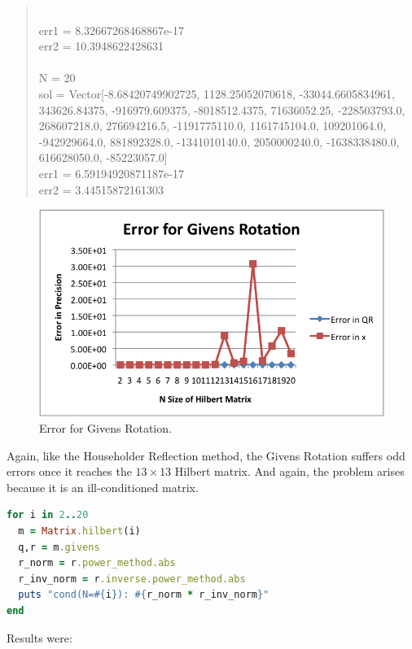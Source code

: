 \documentclass[letterpaper,12pt]{article}
\begin{document}
\begin{quote}
\\err1 = 8.32667268468867e-17
\\err2 = 10.3948622428631
\\
\\N = 20
\\sol = Vector[-8.68420749902725, 1128.25052070618, -33044.6605834961, 343626.84375, -916979.609375, -8018512.4375, 71636052.25, -228503793.0, 268607218.0, 276694216.5, -1191775110.0, 1161745104.0, 109201064.0, -942929664.0, 881892328.0, -1341010140.0, 2050000240.0, -1638338480.0, 616628050.0, -85223057.0]
\\err1 = 6.59194920871187e-17
\\err2 = 3.44515872161303
\end{quote}

\begin{figure}[h] 
  \centering
  \includegraphics{givens.png}
  \caption{\label{givens}Error for Givens Rotation.}
\end{figure}

Again, like the Householder Reflection method, the Givens Rotation suffers odd
errors once it reaches the $13 \times 13$ Hilbert matrix.
And again, the problem arises because it is an ill-conditioned matrix.

\lstset{caption=Determining cond(R) for Givens}
\begin{lstlisting}[language=ruby]
for i in 2..20
  m = Matrix.hilbert(i)
  q,r = m.givens
  r_norm = r.power_method.abs
  r_inv_norm = r.inverse.power_method.abs
  puts "cond(N=#{i}): #{r_norm * r_inv_norm}"
end
\end{lstlisting}

Results were:
\end{document}
